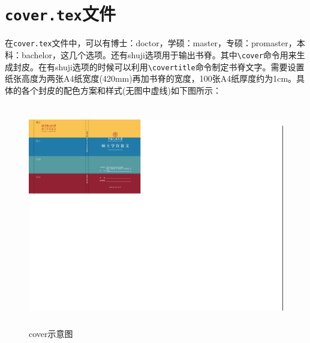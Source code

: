 \section{{\tt cover.tex}文件}
在{\tt cover.tex}文件中，可以有博士：doctor，学硕：master，专硕：promaster，本科：bachelor，这几个选项。还有shuji选项用于输出书脊。其中{\tt \textbackslash cover}命令用来生成封皮。在有shuji选项的时候可以利用{\tt \textbackslash covertitle}命令制定书脊文字。需要设置纸张高度为两张A4纸宽度(420mm)再加书脊的宽度，100张A4纸厚度约为1cm。具体的各个封皮的配色方案和样式(无图中虚线)如下图所示：
\begin{figure}[htbp]
\centering\includegraphics[width=14cm,height=9.7cm]{figures/coverpic.pdf}
\caption[cover示意图]{cover示意图}
\end{figure}